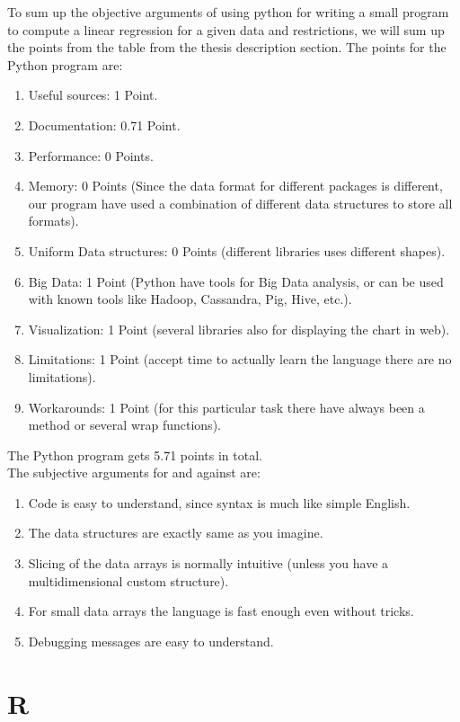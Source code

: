 \documentclass{article}
\begin{document}
To sum up the objective arguments of using python for writing a small program to compute a linear regression for a given data and restrictions, we will sum up the points from the table from the thesis description section.
The points for the Python program are:
\begin{enumerate}
    \item Useful sources: 1 Point.
    \item Documentation: 0.71 Point.
    \item Performance: 0 Points.
    \item Memory: 0 Points (Since the data format for different packages is different, our program have used a combination of different data structures to store all formats).
    \item Uniform Data structures: 0 Points (different libraries uses different shapes).
    \item Big Data: 1 Point (Python have tools for Big Data analysis, or can be used with known tools like Hadoop, Cassandra, Pig, Hive, etc.).
    \item Visualization: 1 Point (several libraries also for displaying the chart in web).
    \item Limitations: 1 Point (accept time to actually learn the language there are no limitations).
    \item Workarounds: 1 Point (for this particular task there have always been a method or several wrap functions).
\end{enumerate} 
The Python program gets 5.71 points in total.\\
The subjective arguments for and against are: 
\begin{enumerate}
    \item Code is easy to understand, since syntax is much like simple English.
    \item The data structures are exactly same as you imagine.
    \item Slicing of the data arrays is normally intuitive (unless you have a multidimensional custom structure).
    \item For small data arrays the language is fast enough even without tricks.
    \item Debugging messages are easy to understand.
\end{enumerate}  

\newpage
\section{R}
\end{document}
